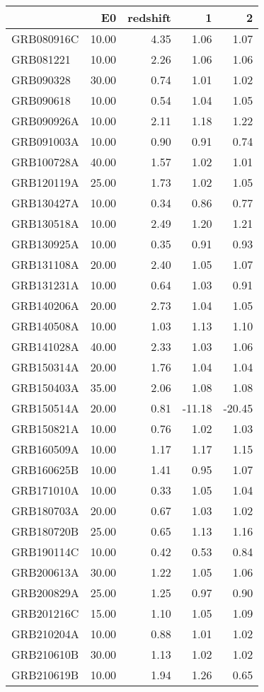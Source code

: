 \begin{tabular}{lrrrr}
\toprule
 & E0 & redshift & 1 & 2 \\
\midrule
GRB080916C & 10.00 & 4.35 & 1.06 & 1.07 \\
GRB081221 & 10.00 & 2.26 & 1.06 & 1.06 \\
GRB090328 & 30.00 & 0.74 & 1.01 & 1.02 \\
GRB090618 & 10.00 & 0.54 & 1.04 & 1.05 \\
GRB090926A & 10.00 & 2.11 & 1.18 & 1.22 \\
GRB091003A & 10.00 & 0.90 & 0.91 & 0.74 \\
GRB100728A & 40.00 & 1.57 & 1.02 & 1.01 \\
GRB120119A & 25.00 & 1.73 & 1.02 & 1.05 \\
GRB130427A & 10.00 & 0.34 & 0.86 & 0.77 \\
GRB130518A & 10.00 & 2.49 & 1.20 & 1.21 \\
GRB130925A & 10.00 & 0.35 & 0.91 & 0.93 \\
GRB131108A & 20.00 & 2.40 & 1.05 & 1.07 \\
GRB131231A & 10.00 & 0.64 & 1.03 & 0.91 \\
GRB140206A & 20.00 & 2.73 & 1.04 & 1.05 \\
GRB140508A & 10.00 & 1.03 & 1.13 & 1.10 \\
GRB141028A & 40.00 & 2.33 & 1.03 & 1.06 \\
GRB150314A & 20.00 & 1.76 & 1.04 & 1.04 \\
GRB150403A & 35.00 & 2.06 & 1.08 & 1.08 \\
GRB150514A & 20.00 & 0.81 & -11.18 & -20.45 \\
GRB150821A & 10.00 & 0.76 & 1.02 & 1.03 \\
GRB160509A & 10.00 & 1.17 & 1.17 & 1.15 \\
GRB160625B & 10.00 & 1.41 & 0.95 & 1.07 \\
GRB171010A & 10.00 & 0.33 & 1.05 & 1.04 \\
GRB180703A & 20.00 & 0.67 & 1.03 & 1.02 \\
GRB180720B & 25.00 & 0.65 & 1.13 & 1.16 \\
GRB190114C & 10.00 & 0.42 & 0.53 & 0.84 \\
GRB200613A & 30.00 & 1.22 & 1.05 & 1.06 \\
GRB200829A & 25.00 & 1.25 & 0.97 & 0.90 \\
GRB201216C & 15.00 & 1.10 & 1.05 & 1.09 \\
GRB210204A & 10.00 & 0.88 & 1.01 & 1.02 \\
GRB210610B & 30.00 & 1.13 & 1.02 & 1.02 \\
GRB210619B & 10.00 & 1.94 & 1.26 & 0.65 \\
\bottomrule
\end{tabular}
